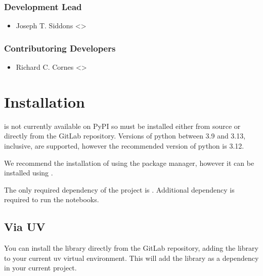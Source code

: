 \documentclass[letterpaper,10pt,english]{sphinxmanual}
\begin{document}
\subsection{Development Lead}
\label{\detokenize{introduction:development-lead}}\begin{itemize}
\item {}
\sphinxAtStartPar
Joseph T. Siddons \textless{}\textgreater{} 

\end{itemize}


\subsection{Contributoring Developers}
\label{\detokenize{introduction:contributoring-developers}}\begin{itemize}
\item {}
\sphinxAtStartPar
Richard C. Cornes \textless{}\textgreater{} 

\end{itemize}

\sphinxstepscope


\chapter{Installation}
\label{\detokenize{installation:installation}}\label{\detokenize{installation::doc}}
\sphinxAtStartPar
{} is not currently available on PyPI so must be installed either from source or directly from the
GitLab repository. Versions of python between 3.9 and 3.13, inclusive, are supported, however the recommended version of
python is 3.12.

\sphinxAtStartPar
We recommend the installation of  using the  package manager, however it can be installed using
.

\sphinxAtStartPar
The only required dependency of the project is . Additional dependency  is required to run the 
notebooks.


\section{Via UV}
\label{\detokenize{installation:via-uv}}
\sphinxAtStartPar
You can install the library directly from the GitLab repository, adding the library to your current uv virtual
environment. This will add the library as a dependency in your current project.
\end{document}
